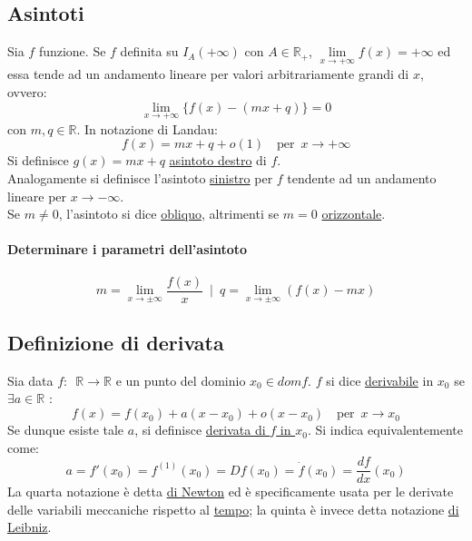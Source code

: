 \documentclass[10pt]{article}
\theoremstyle{plain}
\begin{document}
\subsection{Asintoti}
\begin{defin}
Sia $f$ funzione. 
Se $f$ definita su $I_A(+ \infty)$ con $A \in \mathbb{R}_+$, $\lim \limits_{x \rightarrow + \infty} f(x) = + \infty$ ed essa tende ad un andamento lineare per valori arbitrariamente grandi di $x$, ovvero:
\[\lim \limits_{x \rightarrow + \infty} \{f(x) - (mx + q)\} = 0\]
con $m, q \in \mathbb{R}$. In notazione di Landau:
\[f(x) = mx +q + o(1) \quad \textrm{per} \enspace x \rightarrow + \infty\]
Si definisce $g(x) = mx + q$ \underline{asintoto destro} di $f$.\\ Analogamente si definisce l'asintoto \underline{sinistro} per $f$ tendente ad un andamento lineare per $x \rightarrow - \infty$.\\
Se $m \neq 0$, l'asintoto si dice \underline{obliquo}, altrimenti se $m = 0$ \underline{orizzontale}. 
\end{defin}

\paragraph*{Determinare i parametri dell'asintoto}
\[m = \lim \limits_{x \rightarrow \pm \infty} \frac{f(x)}{x} \enspace | \enspace q = \lim \limits_{x \rightarrow \pm \infty} (f(x) - mx)\]

\subsection{Definizione di derivata}
\begin{defin} Sia data $f : \enspace \mathbb{R} \rightarrow \mathbb{R}$ e un punto del dominio $x_0 \in dom f$. $f$ si dice \underline{derivabile} in $x_0$ se $\exists a \in \mathbb{R}$ :
\[f(x) = f(x_0) + a(x-x_0) + o(x-x_0) \quad \textrm{per} \enspace x \rightarrow x_0\]
Se dunque esiste tale $a$, si definisce \underline{derivata di $f$ in $x_0$}. Si indica equivalentemente come:
\[a = f'(x_0) = f^{(1)}(x_0) = Df(x_0) = \dot{f}(x_0) = \frac{df}{dx}(x_0)\]
La quarta notazione è detta \underline{di Newton} ed è specificamente usata per le derivate delle variabili meccaniche rispetto al \underline{tempo}; la quinta è invece detta notazione \underline{di Leibniz}.
\end{defin}
\end{document}
